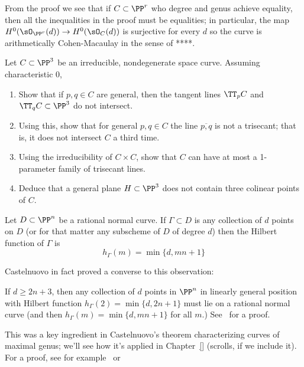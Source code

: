 From the proof we see that if  $C\subset \PP^r$ who degree and genus achieve equality, then all the inequalities in the proof
must be equalities; in particular, the map $H^0(\sO_{\PP^r}(d)) \to H^0(\sO_C(d))$ is surjective for every $d$ so the curve is
arithmetically Cohen-Macaulay in the sense of ****. 

\begin{exercise}\label{weak general position}
Let $C \subset \PP^3$ be an irreducible, nondegenerate space curve. Assuming characteristic 0,
\begin{enumerate}
\item Show that if $p, q \in C$ are general, then the tangent lines $\TT_pC$ and $\TT_qC \subset \PP^3$ do not intersect.
\item Using this, show that for general $p, q \in C$ the line $\overline{p,q}$ is not a trisecant; that is, it does not intersect $C$ a third time.
\item Using the irreducibility of $C \times C$, show that $C$ can have at most a 1-parameter family of trisecant lines.
\item Deduce that a general plane $H \subset \PP^3$ does not contain three colinear points of $C$.
\end{enumerate}
\end{exercise}

\begin{exercise}\label{linear bound is sharp}
Let $D \subset \PP^n$ be a rational normal curve. If $\Gamma \subset D$ is any collection of $d$ points on $D$ (or for that matter any subscheme of $D$ of degree $d$) then the Hilbert function of $\Gamma$ is
$$
h_\Gamma(m) = \min\{d, mn+1\}
$$
\end{exercise} 

Castelnuovo in fact proved a converse to this observation:

\begin{fact}
If $d \geq 2n+3$, then any collection of $d$ points in $\PP^n$ in linearly general position with Hilbert function $h_\Gamma(2) = \min\{d, 2n+1\}$ must lie on a rational normal curve (and then $h_\Gamma(m) = \min\{d, mn+1\}$ for all $m$.) See~\cite[Lemma3.9]{MR685427} for a proof.
\end{fact}

This was a key ingredient in Castelnuovo's theorem characterizing curves of maximal genus; we'll see how it's applied in Chapter~\ref{} (scrolls, if we include it). For a proof, see for example~\cite{ACGH} or~\cite{Montreal}

